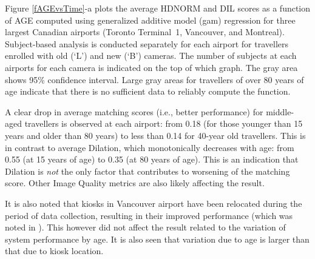 \documentclass{cta-author}%
\begin{document}


Figure \ref{fAGEvsTime}-a %
plots the average HDNORM and  DIL scores as a function of AGE computed using generalized additive model (gam) regression
\cite{R-book} for   three largest Canadian airports (Toronto Terminal~1, Vancouver, and Montreal).
Subject-based analysis is conducted separately for each airport for travellers enrolled with old (`L') and new (`B') cameras.
The number of subjects at each airports for each camera is indicated on the top of which graph.
The gray area shows 95\% confidence interval. 
Large gray areas for travellers of over 80 years of age indicate that there is no sufficient data to reliably compute the function.

A clear drop in average matching scores (i.e., better performance) for middle-aged travellers is observed at each airport: from 0.18 (for those younger than 15 years  and older than 80 years) to less than 0.14 for 40-year old travellers.
This is in contrast to average Dilation, which monotonically decreases with age: from 0.55 (at 15 years of age)  to 0.35 (at 80 years of age).
This is an indication that Dilation is \textit{not} the only factor that contributes to worsening of the matching score. 
Other Image Quality metrics are also likely affecting the result.

It is also noted that kiosks in Vancouver airport have been relocated during the period of data collection, resulting  in their improved performance (which was noted in \cite{Bowyer-BTAS2016}). This however did not affect the result related to the variation of system performance by age.
It is also seen that variation due to age  is larger than that due to kiosk location.
\end{document}
